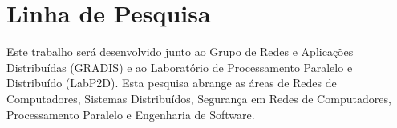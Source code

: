\section{Linha de Pesquisa}

Este trabalho será desenvolvido junto ao Grupo de Redes e Aplicações Distribuídas (GRADIS) e ao Laboratório de Processamento Paralelo e Distribuído (LabP2D). Esta pesquisa abrange as áreas de Redes de Computadores, Sistemas Distribuídos, Segurança em Redes de Computadores, Processamento Paralelo e Engenharia de Software.
